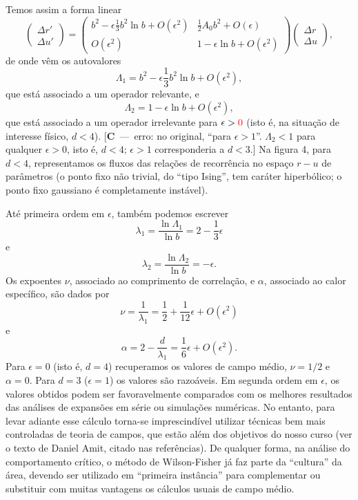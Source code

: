 \documentclass[12pt,a4paper]{article}
\newcommand{\corr}[1]{\textcolor{red}{#1}}
\newcounter{corr}
\newcommand{\nota}[2]{\refstepcounter{corr}\label{#1}%
  {\color{red}\small[\textbf{C\thecorr}~---~#2]}}
\begin{document}
Temos assim a forma linear
\begin{equation}
\left(\begin{array}{c}\Delta r'\\ \Delta u'\end{array}\right)=
\left(\begin{array}{cc}b^2-\epsilon\frac13b^2\ln b+O\left(\epsilon^2\right)&\frac12A_0b^2+O\left(\epsilon\right)\\
O\left(\epsilon^2\right)&1-\epsilon\ln b+O\left(\epsilon^2\right)\end{array}\right)
\left(\begin{array}{c}\Delta r\\ \Delta u\end{array}\right),
\end{equation}
de onde vêm os autovalores
\begin{equation}
\Lambda_1=b^2-\epsilon\frac13b^2\ln b+O\left(\epsilon^2\right),
\end{equation}
que está associado a um operador relevante, e
\begin{equation}
\Lambda_2=1-\epsilon\ln b+O\left(\epsilon^2\right),
\end{equation}
que está associado a um operador irrelevante para $\epsilon>\corr{0}$ (isto é, na situação
de interesse físico, $d<4$).
\nota{c:eps0}{erro: no original, ``para $\epsilon>1$''. $\Lambda_2<1$ para qualquer $\epsilon>0$, isto é,
$d<4$; $\epsilon>1$ corresponderia a $d<3$.}
Na figura 4, para $d<4$, representamos os fluxos
das relações de recorrência no espaço $r-u$ de parâmetros (o ponto fixo não
trivial, do ``tipo Ising'', tem caráter hiperbólico; o ponto fixo gaussiano é
completamente instável).

Até primeira ordem em $\epsilon$, também podemos escrever
\begin{equation}
\lambda_1=\frac{\ln\Lambda_1}{\ln b}=2-\frac13\epsilon
\end{equation}
e
\begin{equation}
\lambda_2=\frac{\ln\Lambda_2}{\ln b}=-\epsilon.
\end{equation}
Os expoentes $\nu$, associado ao comprimento de correlação, e $\alpha$, associado ao
calor específico, são dados por
\[
\nu=\frac{1}{\lambda_1}=\frac12+\frac1{12}\epsilon+O\left(\epsilon^2\right)
\]
e
\begin{equation}
\alpha=2-\frac{d}{\lambda_1}=\frac16\epsilon+O\left(\epsilon^2\right).
\end{equation}
Para $\epsilon=0$ (isto é, $d=4$) recuperamos os valores de campo médio, $\nu=1/2$
e $\alpha=0$. Para $d=3$ ($\epsilon=1$) os valores são razoáveis. Em segunda ordem
em $\epsilon$, os valores obtidos podem ser favoravelmente comparados com os
melhores resultados das análises de expansões em série ou simulações numéricas.
No entanto, para levar adiante esse cálculo torna-se imprescindível utilizar
técnicas bem mais controladas de teoria de campos, que estão além dos
objetivos do nosso curso (ver o texto de Daniel Amit, citado nas referências). De
qualquer forma, na análise do comportamento crítico, o método de
Wilson-Fisher já faz parte da ``cultura'' da área, devendo ser utilizado em ``primeira
instância'' para complementar ou substituir com muitas vantagens os cálculos
usuais de campo médio.
\end{document}
